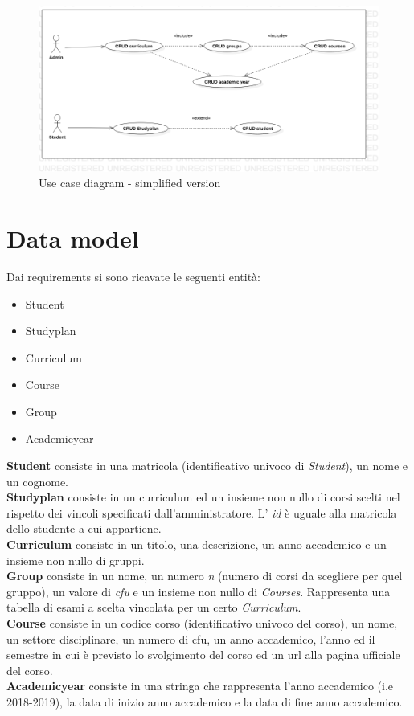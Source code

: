 \documentclass{article}
\begin{document}
\begin{figure}[!h]
  \begin{center}
   \includegraphics[width=\textwidth]{img/UseCaseDiagram.png}
     \caption{Use case diagram - simplified version}
  \label{fig:Usecasediagram}
  \end{center}
\end{figure}

\section{Data model}
Dai requirements si sono  ricavate le seguenti entità:
\begin{itemize}
\item Student
\item Studyplan
\item Curriculum
\item Course
\item Group
\item Academicyear
\end{itemize}
\textbf{Student} consiste in una matricola (identificativo univoco di \emph{Student}), un nome e un cognome.
\\
\textbf{Studyplan} consiste in un curriculum ed un insieme non nullo di corsi scelti nel rispetto dei vincoli specificati dall'amministratore. L' \emph{id} è uguale alla matricola dello studente a cui appartiene.
\\
\textbf{Curriculum} consiste in un titolo, una descrizione, un anno accademico e un insieme non nullo di gruppi.
\\
\textbf{Group} consiste in un nome, un numero \emph{n} (numero di corsi da scegliere per quel gruppo),  un valore di \emph{cfu} e un insieme non nullo di \emph{Courses}. Rappresenta una  tabella di esami a scelta vincolata per un certo \emph{Curriculum}. 
\\
\textbf{Course} consiste in un codice corso (identificativo univoco del corso), un nome, un settore disciplinare, un numero di cfu, un anno accademico,  l'anno ed il semestre in cui è previsto lo svolgimento del corso ed un url alla pagina ufficiale del corso.
\\
\textbf{Academicyear} consiste in una stringa che rappresenta l'anno accademico (i.e 2018-2019), la data di inizio anno accademico e la data di fine anno accademico.
\\
\end{document}
